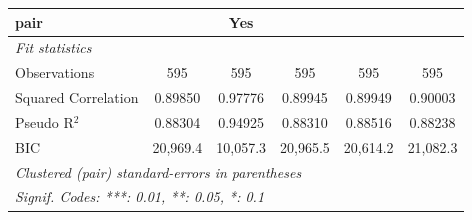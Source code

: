 \begin{tabular}{lccccc}
   pair                       &                & Yes           &                &                & \\  
   \midrule
   \emph{Fit statistics}\\
   Observations               & 595            & 595           & 595            & 595            & 595\\  
   Squared Correlation        & 0.89850        & 0.97776       & 0.89945        & 0.89949        & 0.90003\\  
   Pseudo R$^2$               & 0.88304        & 0.94925       & 0.88310        & 0.88516        & 0.88238\\  
   BIC                        & 20,969.4       & 10,057.3      & 20,965.5       & 20,614.2       & 21,082.3\\  
   \midrule \midrule
   \multicolumn{6}{l}{\emph{Clustered (pair) standard-errors in parentheses}}\\
   \multicolumn{6}{l}{\emph{Signif. Codes: ***: 0.01, **: 0.05, *: 0.1}}\\
\end{tabular}
\par\endgroup


